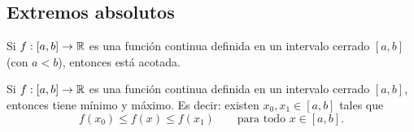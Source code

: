 \documentclass[11pt,a4paper]{article}
\begin{document}

\subsection{Extremos absolutos}

\begin{proposicion}
Si $f:[a,b]\to\mathbb{R}$ es una función continua definida en un intervalo cerrado $[a,b]$ (con $a<b$), entonces está acotada.
\end{proposicion}

\begin{teorema}[Weierstrass]
Si $f:[a,b]\to\mathbb{R}$ es una función continua definida en un intervalo cerrado $[a,b]$, entonces tiene mínimo y máximo. Es decir: existen $x_0,x_1\in[a,b]$ tales que
\[
  f(x_0)\leq f(x)\leq f(x_1)\qquad\text{para todo } x\in[a,b].
\]
\end{teorema}
\end{document}
